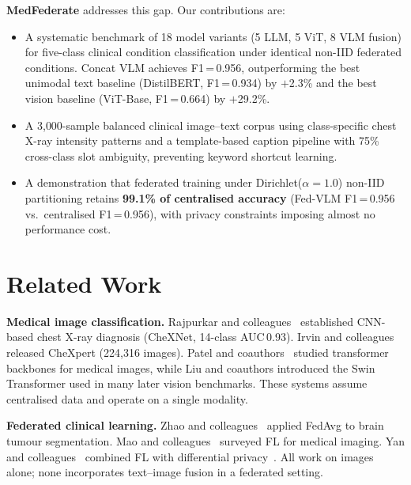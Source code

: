 \documentclass[conference]{IEEEtran}
\begin{document}
\textbf{MedFederate} addresses this gap. Our contributions are:
\begin{itemize}
  \item A systematic benchmark of 18 model variants (5 LLM, 5 ViT, 8 VLM
        fusion) for five-class clinical condition classification under
        identical non-IID federated conditions. Concat VLM achieves
        F1\,=\,0.956, outperforming the best unimodal text baseline
        (DistilBERT, F1\,=\,0.934) by $+$2.3\% and the best vision
        baseline (ViT-Base, F1\,=\,0.664) by $+$29.2\%.

  \item A 3{,}000-sample balanced clinical image--text corpus using
        class-specific chest X-ray intensity patterns and a
        template-based caption pipeline with 75\% cross-class slot
        ambiguity, preventing keyword shortcut learning.

  \item A demonstration that federated training under
        Dirichlet($\alpha{=}1.0$) non-IID partitioning retains
        \textbf{99.1\% of centralised accuracy} (Fed-VLM
        F1\,=\,0.956 vs.\ centralised F1\,=\,0.956), with
        privacy constraints imposing almost no performance cost.
\end{itemize}

\section{Related Work}

\textbf{Medical image classification.}
Rajpurkar and colleagues~\cite{Rajpurkar2017} established CNN-based
chest X-ray diagnosis (CheXNet, 14-class AUC\,0.93).
Irvin and colleagues~\cite{Irvin2019} released CheXpert
(224{,}316 images). Patel and coauthors~\cite{Akkaya2024}
studied transformer backbones for medical images, while Liu and
coauthors introduced the Swin Transformer used in
many later vision benchmarks. These systems assume centralised data and
operate on a single modality.

\textbf{Federated clinical learning.}
Zhao and colleagues~\cite{Zhao2025} applied FedAvg to brain
tumour segmentation. Mao and colleagues~\cite{Mao2025} surveyed FL
for medical imaging. Yan and colleagues~\cite{Yan2024} combined
FL with differential privacy~\cite{Abadi2016}. All work on images alone;
none incorporates text--image fusion in a federated setting.
\end{document}
